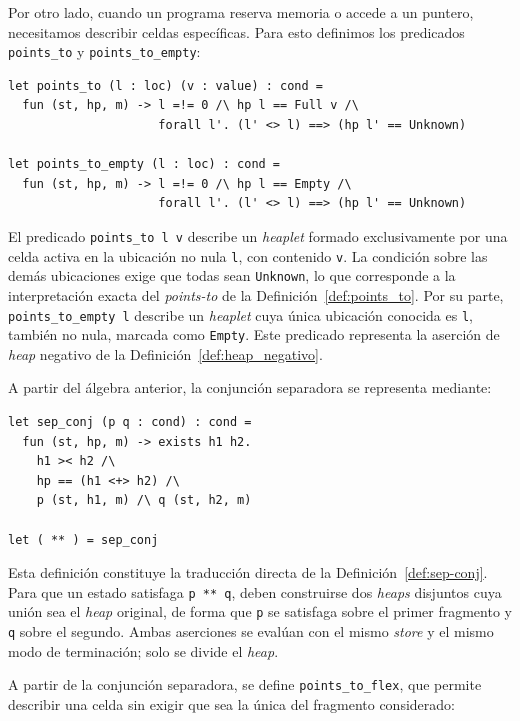 \documentclass[a4paper,	11pt]{report}
\newif\ifdraft\drafttrue
\newcommand{\comm}[3]{\ifdraft{{\color{#1}[#2: #3]}}\fi}
\newcommand{\guido}[1]{\comm{blue}{Guido}{#1}}
\begin{document}
Por otro lado,
cuando un programa reserva memoria o accede a un puntero, necesitamos describir celdas específicas.
Para esto definimos los predicados \lstinline|points_to| y \lstinline|points_to_empty|:

\begin{lstlisting}
let points_to (l : loc) (v : value) : cond =
  fun (st, hp, m) -> l =!= 0 /\ hp l == Full v /\
                     forall l'. (l' <> l) ==> (hp l' == Unknown)

let points_to_empty (l : loc) : cond =
  fun (st, hp, m) -> l =!= 0 /\ hp l == Empty /\
                     forall l'. (l' <> l) ==> (hp l' == Unknown)
\end{lstlisting}

El predicado \lstinline|points_to l v| describe un \emph{heaplet} formado exclusivamente por una celda activa en la ubicación no nula \lstinline|l|,
con contenido \lstinline|v|.
La condición sobre las demás ubicaciones exige que todas sean \lstinline|Unknown|,
lo que corresponde a la interpretación exacta del \emph{points-to} de la Definición~\ref{def:points_to}.
Por su parte,
\lstinline|points_to_empty l| describe un \emph{heaplet} cuya única ubicación conocida es \lstinline|l|,
también no nula,
marcada como \lstinline|Empty|.
Este predicado representa la aserción de \emph{heap} negativo de la Definición~\ref{def:heap_negativo}.

A partir del álgebra anterior,
la conjunción separadora se representa mediante:

\begin{lstlisting}
let sep_conj (p q : cond) : cond =
  fun (st, hp, m) -> exists h1 h2.
    h1 >< h2 /\
    hp == (h1 <+> h2) /\
    p (st, h1, m) /\ q (st, h2, m)

let ( ** ) = sep_conj
\end{lstlisting}

Esta definición constituye la traducción directa de la Definición~\ref{def:sep-conj}.
Para que un estado satisfaga \lstinline|p ** q|,
deben construirse dos \emph{heaps} disjuntos cuya unión sea el \emph{heap} original,
de forma que \lstinline|p| se satisfaga sobre el primer fragmento y \lstinline|q| sobre el segundo.
Ambas aserciones se evalúan con el mismo \emph{store} y el mismo modo de terminación;
solo se divide el \emph{heap}.

A partir de la conjunción separadora,
se define \lstinline|points_to_flex|,
que permite describir una celda sin exigir que sea la única del fragmento considerado:
\end{document}
